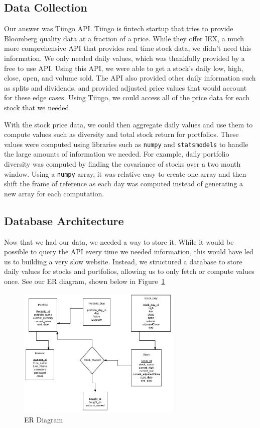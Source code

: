 \documentclass{article}
\begin{document}
\subsection{Data Collection}
Our answer was Tiingo API.  Tiingo is fintech startup that tries to provide Bloomberg quality data at a fraction of a price.  While they offer IEX, a much more comprehensive API that provides real time stock data, we didn’t need this information.  We only needed daily values, which was thankfully provided by a free to use API.  Using this API, we were able to get a stock’s daily low, high, close, open, and volume sold. The API also provided other daily information such as splits and dividends, and provided adjusted price values that would account for these edge cases. Using Tiingo, we could access all of the price data for each stock that we needed.

With the stock price data, we could then aggregate daily values and use them to compute values such as diversity and total stock return for portfolios.  These values were computed using libraries such as \texttt{numpy} and \texttt{statsmodels} to handle the large amounts of information we needed.  For example, daily portfolio diversity was computed by finding the covariance of stocks over a two month window.  Using a \texttt{numpy} array, it was relative easy to create one array and then shift the frame of reference as each day was computed instead of generating a new array for each computation.

\subsection{Database Architecture}
Now that we had our data, we needed a way to store it.  While it would be possible to query the API every time we needed information, this would have led us to building a very slow website.  Instead, we structured a database to store daily values for stocks and portfolios, allowing us to only fetch or compute values once.  See our ER diagram, shown below in Figure~\ref{fig:db_diagram}

\begin{figure}[H]
\begin{center}
\includegraphics[width=0.7\textwidth]{db_diagram}
\caption{\label{fig:db_diagram} ER Diagram}
\end{center}
\end{figure}
\end{document}
